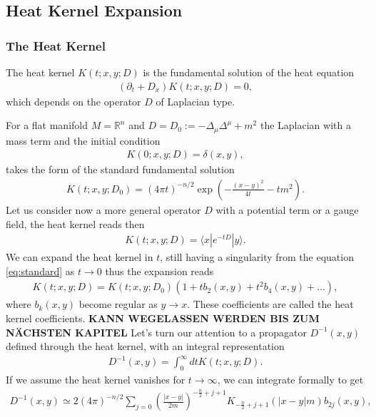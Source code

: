 \subsection{Heat Kernel Expansion}
\subsubsection{The Heat Kernel}
The heat kernel $K(t; x, y; D)$ is the fundamental solution of the heat
equation
\begin{align}
    (\partial _t + D_x)K(t;x, y;D) =0,
\end{align}
which depends on the operator $D$ of Laplacian type.

For a flat manifold $M = \mathbb{R}^n$ and $D = D_0 := -\Delta_\mu\Delta^\mu +m^2$ the
Laplacian with a mass term and the initial condition
\begin{align}
    K(0;x,y;D) = \delta(x,y),
\end{align}
takes the form of the standard fundamental solution
\begin{align}\label{eq:standard}
    K(t;x,y;D_0) = (4\pi t)^{-n/2}\exp\left(-\frac{(x-y)^2}{4t}-tm^2\right).
\end{align}
Let us consider now a more general operator $D$ with a potential term or a
gauge field, the heat kernel reads then
\begin{align}
    K(t;x,y;D) = \langle x|e^{-tD}|y\rangle.
\end{align}
We can expand the heat kernel in $t$, still having a
singularity from the equation \ref{eq:standard} as $t \rightarrow 0$ thus the
expansion reads
\begin{align}
    K(t;x,y;D) = K(t;x,y;D_0)\left(1 + tb_2(x,y) + t^2b_4(x,y) + \dots
    \right),
\end{align}
where $b_k(x,y)$ become regular as $y \rightarrow x$. These coefficients are called the heat
kernel coefficients.
\newline
\textbf{KANN WEGELASSEN WERDEN BIS ZUM NÄCHSTEN KAPITEL}
Let's turn our attention to a propagator $D^{-1}(x,y)$ defined through the
heat kernel, with an integral representation
\begin{align}
    D^{-1} (x,y) = \int_0^\infty dt K(t;x,y;D).
\end{align}
If we assume the heat kernel vanishes for $t\rightarrow \infty$, we can
integrate formally to get
\begin{align}
    D^{-1}(x,y) \simeq
    2(4\pi)^{-n/2}\sum_{j=0}\left(\frac{|x-y|}{2m}\right)^{-\frac{n}{2}+j+1}
    K_{-\frac{n}{2}+j+1}(|x-y|m)b_{2j}(x,y),
\end{align}
